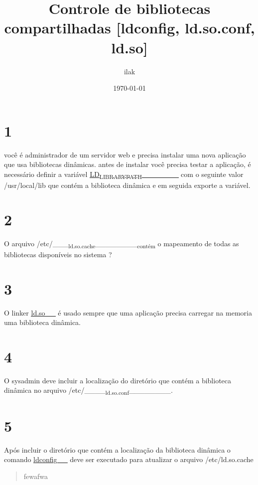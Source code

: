 \documentclass[11pt]{article}
\author{ilak}
\date{\today}
\title{Controle de bibliotecas compartilhadas [ldconfig, ld.so.conf, ld.so]}
\begin{document}
\maketitle
\tableofcontents

\section{1}
\label{sec:orgebded0c}
você é administrador de um servidor web e precisa instalar uma nova aplicação que usa bibliotecas dinâmicas. antes de instalar você precisa testar a aplicação, é necessário definir a variável \uline{\uline{\uline{\uline{\uline{LD\textsubscript{LIBRARY}\textsubscript{PATH}\_\_\_\_\_\_\_}}}}} com o seguinte valor /usr/local/lib que contém a biblioteca dinâmica e em seguida exporte a variável.
\section{2}
\label{sec:org54bb601}
O arquivo /etc/\_\_\_\textsubscript{ld.so.cache}\_\_\_\_\_\_\_\_\textsubscript{contém} o mapeamento de todas as bibliotecas disponíveis no sistema ?
\section{3}
\label{sec:orgaee3079}
O linker \uline{\uline{\uline{ld.so\_\_}}} é usado sempre que uma aplicação precisa carregar na memoria uma biblioteca dinâmica.
\section{4}
\label{sec:org2187184}
O sysadmin deve incluir a localização do diretório que contém a biblioteca dinâmica no arquivo /etc/\_\_\_\_\textsubscript{ld.so.conf}\_\_\_\_\_\_\_\_.
\section{5}
\label{sec:org1563fd8}
Após incluir o diretório que contém a localização da biblioteca dinâmica o comando \uline{\uline{ldconfig\_\_}} deve ser executado para atualizar o arquivo /etc/ld.so.cache


\begin{quote}
fewafwa
\end{quote}
\end{document}

